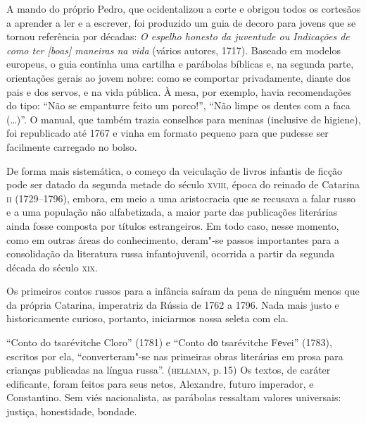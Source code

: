 A mando do próprio Pedro, que ocidentalizou a corte e obrigou todos os
cortesãos a aprender a ler e a escrever, foi produzido um guia de decoro
para jovens que se tornou referência por décadas: \emph{O espelho
honesto da juventude ou Indicações de como ter {[}boas{]} maneiras na
vida} (vários autores, 1717). Baseado em modelos europeus, o guia
continha uma cartilha e parábolas bíblicas e, na segunda parte,
orientações gerais ao jovem nobre: como se comportar privadamente,
diante dos pais e dos servos, e na vida pública. À mesa, por exemplo,
havia recomendações do tipo: ``Não se empanturre feito um porco!'',
``Não limpe os dentes com a faca (\ldots{})''. O manual, que também
trazia conselhos para meninas (inclusive de higiene), foi republicado
até 1767 e vinha em formato pequeno para que pudesse ser facilmente
carregado no bolso.

De forma mais sistemática, o começo da veiculação de livros infantis de
ficção pode ser datado da segunda metade do século \textsc{xviii}, época do
reinado de Catarina \textsc{ii} (1729--1796), embora, em meio a uma aristocracia
que se recusava a falar russo e a uma população não alfabetizada, a
maior parte das publicações literárias ainda fosse composta por títulos
estrangeiros. Em todo caso, nesse momento, como em outras áreas do
conhecimento, deram"-se passos importantes para a consolidação da
literatura russa infantojuvenil, ocorrida a partir da segunda década do
século \textsc{xix}.

Os primeiros contos russos para a infância saíram da pena de ninguém menos
que da própria Catarina, imperatriz da Rússia de 1762 a
1796. Nada mais justo e historicamente curioso, portanto, iniciarmos
nossa seleta com ela.

``Conto do tsarévitche Cloro'' (1781) e ``Conto dо
tsarévitche Fеvei'' (1783), escritos por ela, ``converteram"-se
nas primeiras obras literárias em prosa para crianças publicadas na
língua russa''. (\textsc{hellman}, p.\,15) Os textos, de caráter edificante, foram
feitos para seus netos, Alexandre, futuro imperador, e Constantino. Sem
viés nacionalista, as parábolas ressaltam valores universais: justiça,
honestidade, bondade.

